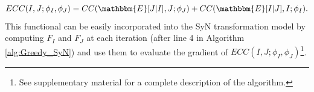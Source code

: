 \begin{equation*}
    ECC(I, J;\phi_{I}, \phi_{J}) = CC(\mathbbm{E}[J|I], J ; \phi_{J}) + CC(\mathbbm{E}[I|J], I ; \phi_{I}).
\end{equation*}
This functional can be easily incorporated into the SyN transformation model by computing $F_{I}$ and $F_{J}$ at each iteration (after line 4 in Algorithm \ref{alg:Greedy_SyN}) and use them to evaluate the gradient of $ECC(I, J;\phi_{I}, \phi_{J})$\footnote{See supplementary material for a complete description of the algorithm.}.



